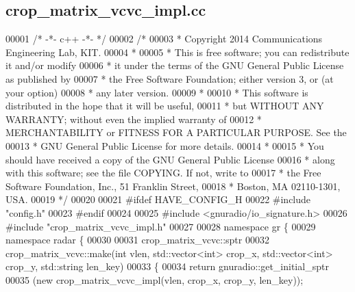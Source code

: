 \subsection{crop\+\_\+matrix\+\_\+vcvc\+\_\+impl.\+cc}
\label{crop__matrix__vcvc__impl_8cc_source}

\begin{DoxyCode}
00001 \textcolor{comment}{/* -*- c++ -*- */}
00002 \textcolor{comment}{/* }
00003 \textcolor{comment}{ * Copyright 2014 Communications Engineering Lab, KIT.}
00004 \textcolor{comment}{ * }
00005 \textcolor{comment}{ * This is free software; you can redistribute it and/or modify}
00006 \textcolor{comment}{ * it under the terms of the GNU General Public License as published by}
00007 \textcolor{comment}{ * the Free Software Foundation; either version 3, or (at your option)}
00008 \textcolor{comment}{ * any later version.}
00009 \textcolor{comment}{ * }
00010 \textcolor{comment}{ * This software is distributed in the hope that it will be useful,}
00011 \textcolor{comment}{ * but WITHOUT ANY WARRANTY; without even the implied warranty of}
00012 \textcolor{comment}{ * MERCHANTABILITY or FITNESS FOR A PARTICULAR PURPOSE.  See the}
00013 \textcolor{comment}{ * GNU General Public License for more details.}
00014 \textcolor{comment}{ * }
00015 \textcolor{comment}{ * You should have received a copy of the GNU General Public License}
00016 \textcolor{comment}{ * along with this software; see the file COPYING.  If not, write to}
00017 \textcolor{comment}{ * the Free Software Foundation, Inc., 51 Franklin Street,}
00018 \textcolor{comment}{ * Boston, MA 02110-1301, USA.}
00019 \textcolor{comment}{ */}
00020 
00021 \textcolor{preprocessor}{#ifdef HAVE\_CONFIG\_H}
00022 \textcolor{preprocessor}{#include "config.h"}
00023 \textcolor{preprocessor}{#endif}
00024 
00025 \textcolor{preprocessor}{#include <gnuradio/io\_signature.h>}
00026 \textcolor{preprocessor}{#include "crop_matrix_vcvc_impl.h"}
00027 
00028 \textcolor{keyword}{namespace }gr \{
00029   \textcolor{keyword}{namespace }radar \{
00030 
00031     crop_matrix_vcvc::sptr
00032     crop_matrix_vcvc::make(\textcolor{keywordtype}{int} vlen, std::vector<int> crop\_x, std::vector<int> crop\_y, 
      std::string len\_key)
00033     \{
00034       \textcolor{keywordflow}{return} gnuradio::get\_initial\_sptr
00035         (\textcolor{keyword}{new} crop_matrix_vcvc_impl(vlen, crop\_x, crop\_y, len\_key));

\end{DoxyCode}
